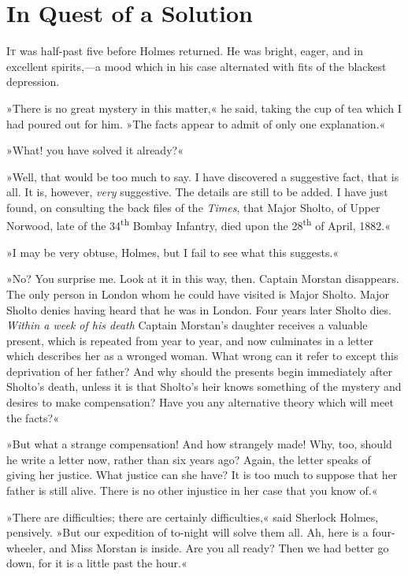 \chapter{In Quest of a Solution}
\lettrine[lines=4]{I}{t} was half-past five before Holmes returned. He was bright, eager, and in excellent spirits,—a mood which in his case alternated with fits of the blackest depression.

\zz
»There is no great mystery in this matter,« he said, taking the cup of tea which I had poured out for him. »The facts appear to admit of only one explanation.«

»What! you have solved it already?«

»Well, that would be too much to say. I have discovered a suggestive fact, that is all. It is, however, \textit{very} suggestive. The details are still to be added. I have just found, on consulting the back files of the \textit{Times}, that Major Sholto, of Upper Norwood, late of the 34\textsuperscript{th} Bombay Infantry, died upon the 28\textsuperscript{th} of April, 1882.«

»I may be very obtuse, Holmes, but I fail to see what this suggests.«

»No? You surprise me. Look at it in this way, then. Captain Morstan disappears. The only person in London whom he could have visited is Major Sholto. Major Sholto denies having heard that he was in London. Four years later Sholto dies. \textit{Within a week of his death} Captain Morstan's daughter receives a valuable present, which is repeated from year to year, and now culminates in a letter which describes her as a wronged woman. What wrong can it refer to except this deprivation of her father? And why should the presents begin immediately after Sholto's death, unless it is that Sholto's heir knows something of the mystery and desires to make compensation? Have you any alternative theory which will meet the facts?«

»But what a strange compensation! And how strangely made! Why, too, should he write a letter now, rather than six years ago? Again, the letter speaks of giving her justice. What justice can she have? It is too much to suppose that her father is still alive. There is no other injustice in her case that you know of.«

»There are difficulties; there are certainly difficulties,« said Sherlock Holmes, pensively. »But our expedition of to-night will solve them all. Ah, here is a four-wheeler, and Miss Morstan is inside. Are you all ready? Then we had better go down, for it is a little past the hour.«

